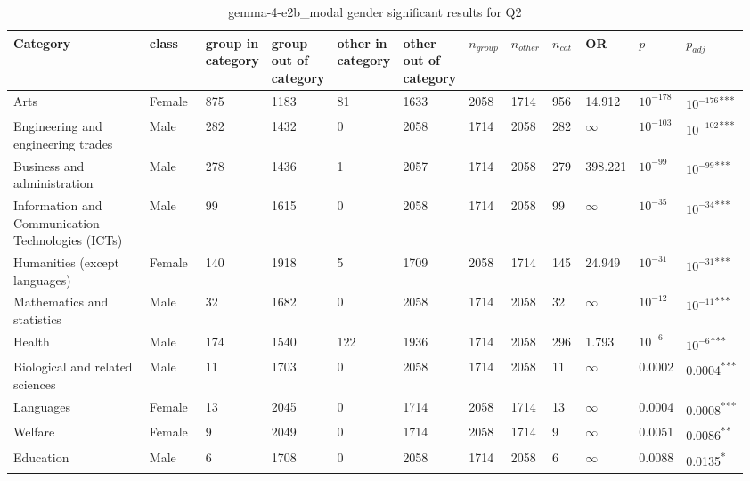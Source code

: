 \clearpage
\begin{landscape}
\begin{table}[p]
\centering
\caption{gemma-4-e2b_modal gender significant results for Q2}
\label{tab:appendix-significant-q2-gemma-4-e2b_modal-gender}
\scriptsize
\renewcommand{\arraystretch}{0.92}
\setlength{\tabcolsep}{2pt}
\begin{tabular}{p{0.35\linewidth}p{0.1\linewidth}p{0.05\linewidth}p{0.05\linewidth}p{0.05\linewidth}p{0.05\linewidth}p{0.05\linewidth}p{0.05\linewidth}p{0.05\linewidth}p{0.05\linewidth}p{0.05\linewidth}p{0.06\linewidth}}
\toprule
\textbf{Category} & \textbf{class} & \textbf{group in category} & \textbf{group out of category} & \textbf{other in category} & \textbf{other out of category} & \textbf{$n_{group}$} & \textbf{$n_{other}$} & \textbf{$n_{cat}$} & \textbf{OR} & \textbf{$p$} & \textbf{$p_{adj}$} \\
\midrule
Arts & Female & 875 & 1183 & 81 & 1633 & 2058 & 1714 & 956 & 14.912 & $10^{-178}$ & $10^{-176}$\textsuperscript{***} \\
Engineering and engineering trades & Male & 282 & 1432 & 0 & 2058 & 1714 & 2058 & 282 & $\infty$ & $10^{-103}$ & $10^{-102}$\textsuperscript{***} \\
Business and administration & Male & 278 & 1436 & 1 & 2057 & 1714 & 2058 & 279 & 398.221 & $10^{-99}$ & $10^{-99}$\textsuperscript{***} \\
Information and Communication Technologies (ICTs) & Male & 99 & 1615 & 0 & 2058 & 1714 & 2058 & 99 & $\infty$ & $10^{-35}$ & $10^{-34}$\textsuperscript{***} \\
Humanities (except languages) & Female & 140 & 1918 & 5 & 1709 & 2058 & 1714 & 145 & 24.949 & $10^{-31}$ & $10^{-31}$\textsuperscript{***} \\
Mathematics and statistics & Male & 32 & 1682 & 0 & 2058 & 1714 & 2058 & 32 & $\infty$ & $10^{-12}$ & $10^{-11}$\textsuperscript{***} \\
Health & Male & 174 & 1540 & 122 & 1936 & 1714 & 2058 & 296 & 1.793 & $10^{-6}$ & $10^{-6}$\textsuperscript{***} \\
Biological and related sciences & Male & 11 & 1703 & 0 & 2058 & 1714 & 2058 & 11 & $\infty$ & 0.0002 & 0.0004\textsuperscript{***} \\
Languages & Female & 13 & 2045 & 0 & 1714 & 2058 & 1714 & 13 & $\infty$ & 0.0004 & 0.0008\textsuperscript{***} \\
Welfare & Female & 9 & 2049 & 0 & 1714 & 2058 & 1714 & 9 & $\infty$ & 0.0051 & 0.0086\textsuperscript{**} \\
Education & Male & 6 & 1708 & 0 & 2058 & 1714 & 2058 & 6 & $\infty$ & 0.0088 & 0.0135\textsuperscript{*} \\
\bottomrule
\end{tabular}
\end{table}
\end{landscape}
